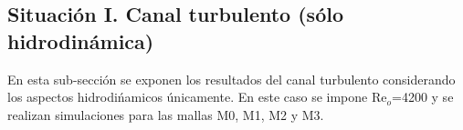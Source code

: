 \subsection{Situación I. Canal turbulento (sólo hidrodinámica)}

En esta sub-sección se exponen los resultados del canal turbulento considerando los aspectos hidrodińamicos únicamente. En este caso se impone Re$_o$=4200 y se realizan simulaciones para las mallas M0, M1, M2 y M3.  

\begin{figure}[H]
 \centering
    

\end{figure}
